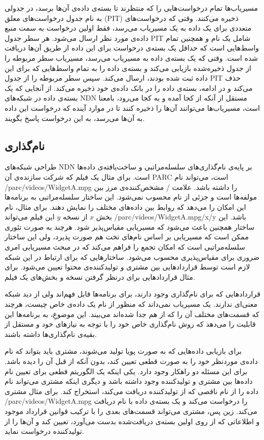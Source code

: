 مسیریاب‌ها تمام درخواست‌‌هایی را که منتظرند تا بسته‌ی داده‌ی آن‌ها برسد، در جدولی به نام جدول درخواست‌های معلق
(PIT)
ذخیره‌ می‌کنند. وقتی که درخواست‌‌‌های متعددی برای یک داده به یک مسیریاب می‌رسد، فقط اولین درخواست به سمت منبع داده‌ی مورد نظر ارسال می‌شود. هر سطر جدول PIT شامل یک نام و همچنین تمام واسط‌‌هایی است که حداقل یک بسته‌ی درخواست برای این داده از طریق آن‌ها دریافت شده است. وقتی که یک بسته‌ی داده به مسیریاب می‌رسد، مسیریاب سطر مربوطه را از جدول ذخیره‌شده بازیابی می‌کند و بسته‌ی داده را به تمام واسط‌هایی که برای این داده ثبت شده بودند، ارسال می‌کند. سپس سطر مربوطه را از جدول PIT  حذف می‌کند و در ادامه، بسته‌‌ی داده را در بانک داده‌ی خود ذخیره می‌کند. از آنجایی که یک بسته‌ی داده در شبکه‌های NDN مستقل از آنکه از کجا آمده و به کجا می‌رود، بامعنا است، مسیریاب‌ها می‌توانند آن‌ها را ذخیره کنند تا در موارد آینده که درخواست این داده به آن‌ها می‌رسد، به این درخواست پاسخ بگویند. 

\subsection{نام‌گذاری}
طراحی شبکه‌های NDN بر پایه‌ی نام‌گذاری‌های سلسله‌مراتبی و ساخت‌یافته‌ی داده‌ها است. برای مثال یک فیلم که شرکت سازنده‌ی آن PARC است، می‌تواند نام /parc/videos/WidgetA.mpg را داشته باشد. علامت / مشخص‌کننده‌ی مرز بین مولفه‌ها است و جزئی از نام محسوب نمی‌شود. این ساختار سلسله‌مراتبی به برنامه‌ها این امکان را می‌دهد که روابط بین داده‌های مختلف را نمایش دهند. برای مثال، نام بخش $x$ از نسخه $y$ این فیلم می‌تواند /parc/videos/WidgetA.mpg/x/y باشد. این ساختار همچنین باعث می‌شود که مسیریابی مقیاس‌پذیر شود. هرچند به صورت تئوری ممکن است که مسیریابی بر اساس نام‌های تخت  هم صورت پذیرد،
\cite{rofl}
 ولی این ساختار سلسله‌مراتبی است که امکان تجمع را فراهم می‌کند که در مبحث مسیریابی امری ضروری برای مقیاس‌پذیری محسوب می‌شود. ساختارهایی که برای ارتباط در این شبکه لازم است توسط قرارداد‌هایی بین مشتری و تولیدکننده‌ی محتوا تعیین می‌شود. برای مثال قراردادهایی برای درنظر گرفتن نسخه و بخش‌های یک فیلم.
 
قراردادهایی که برای نام‌گذاری وجود دارند، برای برنامه‌ها قابل فهم‌اند ولی از دید شبکه معنی‌ای ندارند. یک مسیریاب نمی‌داند که منظور از نام یک داده‌ی خاص چیست، هرچند که قسمت‌های مختلف آن را که از هم جدا شده‌اند می‌بیند. این موضوعِ، به برنامه‌ها این قابلیت را می‌دهد که روش نام‌گذاری خاص خود را با توجه به نیاز‌های خود و مستقل از بقیه‌ی نام‌گذاری‌ها داشته باشند. 

برای بازیابی داده‌هایی که به صورت پویا تولید می‌شوند، مشتری باید بتواند که نام داده‌ی موردنظر خود را به صورت قطعی تعیین کند، بدون آنکه از قبل آن را دیده باشد. برای این مسئله دو راهکار وجود دارد. یکی اینکه یک الگوریتم قطعی برای تعیین نام داده‌ها بین مشتری و تولیدکننده وجود داشته باشد  و دیگری اینکه مشتری می‌تواند نام داده را از نام ناقصی که از تولیدکننده دریافت‌ می‌کند، استخراج کند. برای مثال مشتری /parc/videos/WidgetA.mpg را درخواست می‌کند و یک بسته‌ی داده‌ با نام  دریافت می‌کند. زین پس، مشتری می‌تواند قسمت‌های بعدی را با ترکیب قوانین قرارداد موجود و اطلاعاتی که از روی اولین بسته‌ی دریافت‌شده بدست می‌آورد، تعیین کند و آن‌ها را از تولیدکننده درخواست نماید. 

